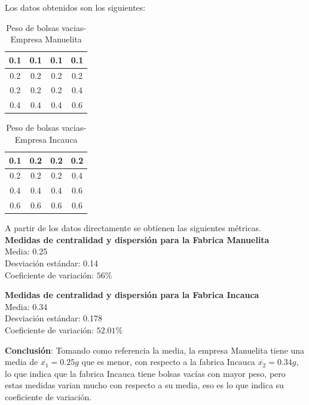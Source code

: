 \documentclass[12pt]{article}
\begin{document}
	Los datos obtenidos son los siguientes:\\ 
	
	\begin{table}[h!]
		\centering
		\begin{tabular}{|c|c|c|c|} 
			\hline
			0.1 & 0.1 & 0.1 & 0.1 \\ 
			\hline
			0.2 & 0.2 & 0.2 & 0.2 \\ 
			\hline
			0.2 & 0.2 & 0.2 & 0.4 \\ 
			\hline
			0.4 & 0.4 & 0.4 & 0.6 \\ 
			\hline
		\end{tabular}
		\caption{Peso de bolsas vacias-Empresa Manuelita}
	\end{table} \newpage
	
	\begin{table}[h!]
		\centering
		\begin{tabular}{|c|c|c|c|} 
			\hline
			0.1 & 0.2 & 0.2 & 0.2 \\ 
			\hline
			0.2 & 0.2 & 0.2 & 0.4 \\ 
			\hline
			0.4 & 0.4 & 0.4 & 0.6 \\ 
			\hline
			0.6 & 0.6 & 0.6 & 0.6 \\ 
			\hline
		\end{tabular}
		\caption{Peso de bolsas vacias-Empresa Incauca}
	\end{table}
	
	A partir de los datos directamente se obtienen las siguientes métricas. \\
	
	\textbf{{\large Medidas de centralidad y dispersión para la Fabrica Manuelita}}\\
	{\large Media:} 0.25 \\
	{\large Desviación estándar:} 0.14 \\
	{\large Coeficiente de variación}: $56\%$ \\
	\vspace{0.2cm}
	
	\textbf{{\large Medidas de centralidad y dispersión para la Fabrica Incauca}}\\
	{\large Media:} 0.34 \\
	{\large Desviación estándar:} 0.178 \\
	{\large Coeficiente de variación}: $52.01\%$ \\
	\vspace{0.2cm}
	
	{\large \textbf{Conclusión}}: 
	Tomando como referencia la media, la empresa Manuelita tiene una media de $\overline{x_1}=0.25g$ que es menor, con respecto a la fabrica Incauca $\overline{x_2}=0.34g$, lo que indica que la fabrica Incauca tiene bolsas vacías con mayor peso, pero estas medidas varian mucho con respecto a su media, eso es lo que indica su coeficiente de variación. 
	
\end{document}

